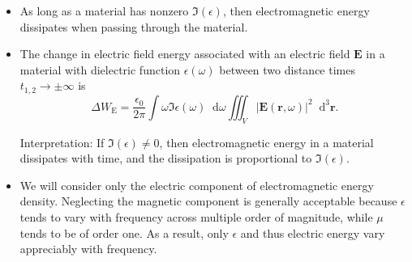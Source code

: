 \documentclass[11pt, a4paper]{article}
\newcommand{\diff}{\mathop{}\!\mathrm{d}} %
\newcommand{\dr}{\diff^{3} \r}  %
\renewcommand{\vec}[1]{\bm{#1}} %
\renewcommand{\r}{\vec{r}}
\newcommand{\E}{\vec{E}} %
\newcommand{\ee}{\epsilon_{0}}  %
\begin{document}
\begin{itemize}

    \item As long as a material has nonzero $ \Im(\epsilon) $, then electromagnetic energy dissipates when passing through the material.

    \item The change in electric field energy associated with an electric field $ \E $ in a material with dielectric function $ \epsilon(\omega) $ between two distance times $ t_{1,2} \to \pm \infty $ is
    \begin{equation*}
        \Delta W_{\text{E}} = \frac{\ee}{2\pi} \int \omega \Im \epsilon(\omega) \diff \omega \iiint_{V} \big |\E(\r, \omega)\big |^{2} \dr.
    \end{equation*}

    Interpretation: If $ \Im(\epsilon) \neq 0 $, then electromagnetic energy in a material dissipates with time, and the dissipation is proportional to $ \Im(\epsilon) $.

    \item We will consider only the electric component of electromagnetic energy density. Neglecting the magnetic component is generally acceptable because $ \epsilon $ tends to vary with frequency across multiple order of magnitude, while $ \mu $ tends to be of order one. As a result, only $ \epsilon $ and thus electric energy vary appreciably with frequency.

\end{itemize}
\end{document}
